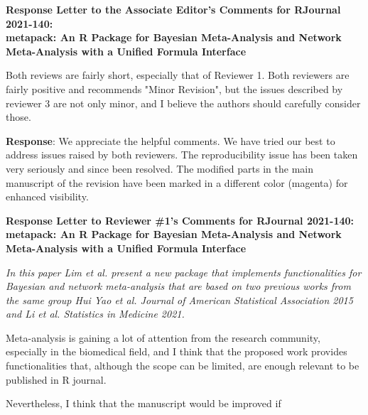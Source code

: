 \documentclass[11pt]{article}
\newcommand{\1}{{\bf{{1}}}}
\begin{document}
\setcounter{page}{1}

\renewcommand\thefigure{R.\arabic{figure}}
\setcounter{figure}{0}



\begin{center}
{\large \bf Response Letter to the Associate Editor's Comments for RJournal 2021-140: \\
metapack: An R Package for Bayesian Meta-Analysis and Network Meta-Analysis with a Unified Formula Interface}
\end{center}


Both reviews are fairly short, especially that of Reviewer 1. Both reviewers are fairly positive and recommends "Minor Revision", but the issues described by reviewer 3 are not only minor, and I believe the authors should carefully consider those.

\noindent
{\bf Response}: We appreciate the helpful comments. We have tried our best to address issues raised by both reviewers. The reproducibility issue has been taken very seriously and since been resolved. The modified parts in the main manuscript of the revision have been marked in a different color ({\color{magenta}magenta}) for enhanced visibility.

\newpage


\begin{center}
{\large \bf Response Letter to  Reviewer \#1's Comments for RJournal 2021-140: \\
metapack: An R Package for Bayesian Meta-Analysis and Network Meta-Analysis with a Unified Formula Interface}
\end{center}

{\it In this paper Lim et al. present a new package that implements functionalities for Bayesian and network meta-analysis that are based on two previous works
from the same group Hui Yao et al. Journal of American Statistical Association 2015 and Li et al. Statistics in Medicine 2021.

Meta-analysis is gaining a lot of attention from the research community, especially in the biomedical field, and I think that the proposed work provides functionalities that, although the scope can be limited, are enough relevant to be published in R journal.

Nevertheless, I think that the manuscript would be improved if}
\end{document}
